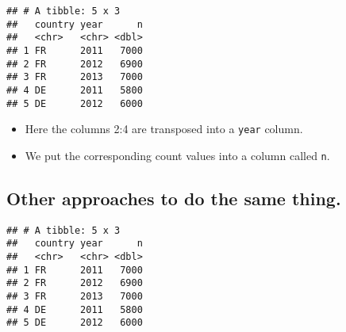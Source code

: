 \documentclass[]{article}
\newenvironment{Shaded}{\begin{snugshade}}{\end{snugshade}}
\newcommand{\CommentTok}[1]{\textcolor[rgb]{0.56,0.35,0.01}{\textit{#1}}}
\newcommand{\DataTypeTok}[1]{\textcolor[rgb]{0.13,0.29,0.53}{#1}}
\newcommand{\DecValTok}[1]{\textcolor[rgb]{0.00,0.00,0.81}{#1}}
\newcommand{\KeywordTok}[1]{\textcolor[rgb]{0.13,0.29,0.53}{\textbf{#1}}}
\newcommand{\NormalTok}[1]{#1}
\newcommand{\OperatorTok}[1]{\textcolor[rgb]{0.81,0.36,0.00}{\textbf{#1}}}
\newcommand{\StringTok}[1]{\textcolor[rgb]{0.31,0.60,0.02}{#1}}
\providecommand{\tightlist}{%
  \setlength{\itemsep}{0pt}\setlength{\parskip}{0pt}}
\begin{document}
\begin{verbatim}
## # A tibble: 5 x 3
##   country year      n
##   <chr>   <chr> <dbl>
## 1 FR      2011   7000
## 2 FR      2012   6900
## 3 FR      2013   7000
## 4 DE      2011   5800
## 5 DE      2012   6000
\end{verbatim}

\begin{itemize}
\tightlist
\item
  Here the columns 2:4 are transposed into a \texttt{year} column.
\item
  We put the corresponding count values into a column called \texttt{n}.
\end{itemize}

\hypertarget{other-approaches-to-do-the-same-thing.}{%
\subsection{Other approaches to do the same
thing.}\label{other-approaches-to-do-the-same-thing.}}

\begin{Shaded}
\end{Shaded}

\begin{verbatim}
## # A tibble: 5 x 3
##   country year      n
##   <chr>   <chr> <dbl>
## 1 FR      2011   7000
## 2 FR      2012   6900
## 3 FR      2013   7000
## 4 DE      2011   5800
## 5 DE      2012   6000
\end{verbatim}

\begin{Shaded}
\end{Shaded}
\end{document}
